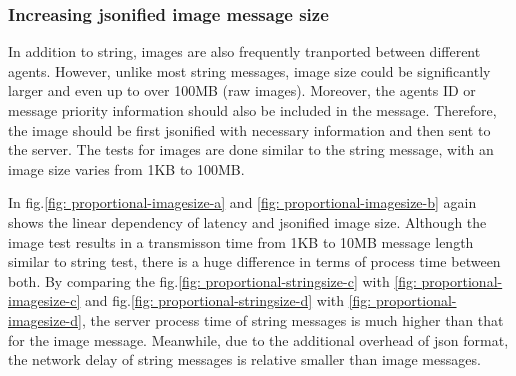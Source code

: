 \subsubsection{Increasing jsonified image message size}
In addition to string, images are also frequently tranported between different agents. 
However, unlike most string messages, image size could be significantly larger 
and even up to over 100MB (raw images). Moreover, the agents ID or message priority 
information should also be included in the message. Therefore, the image should 
be first jsonified with necessary information and then sent to the server. 
The tests for images are done similar to the string message, with an image size 
varies from 1KB to 100MB. 


In fig.\ref{fig: proportional-imagesize-a} and \ref{fig: proportional-imagesize-b} 
again shows the linear dependency of latency and jsonified image size. 
Although the image test results in a 
transmisson time from 1KB to 10MB message length similar to string test, 
there is a huge difference in terms of process time between both. By comparing the 
fig.\ref{fig: proportional-stringsize-c} with \ref{fig: proportional-imagesize-c} 
and fig.\ref{fig: proportional-stringsize-d} with \ref{fig: proportional-imagesize-d}, 
the server process time of string messages is much higher than that for the 
image message. Meanwhile, due to the additional overhead of json format, the network 
delay of string messages is relative smaller than image messages. 


